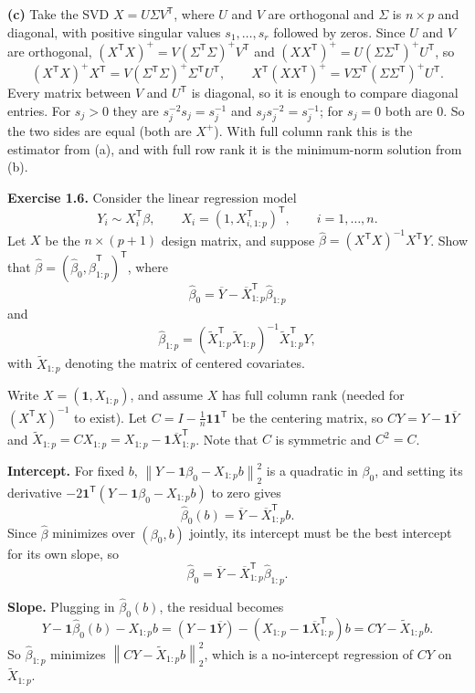 \documentclass[answers,12pt,addpoints]{exam}
\newcommand{\trans}{^{\mathsf T}}
\newcommand{\normtwo}[1]{\left\lVert #1\right\rVert_2}
\newcommand{\ones}{\mathbf{1}}  %
\begin{document}
\begin{questions}
\begin{solution}
\textbf{(c)} Take the SVD $X=U\Sigma V\trans$, where $U$ and $V$ are
orthogonal and $\Sigma$ is $n\times p$ and diagonal, with positive singular
values $s_1,\ldots,s_r$ followed by zeros. Since $U$ and $V$ are orthogonal,
$(X\trans X)^+=V(\Sigma\trans\Sigma)^+V\trans$ and
$(XX\trans)^+=U(\Sigma\Sigma\trans)^+U\trans$, so
\[
(X\trans X)^+X\trans=V(\Sigma\trans\Sigma)^+\Sigma\trans U\trans,
\qquad
X\trans(XX\trans)^+=V\Sigma\trans(\Sigma\Sigma\trans)^+U\trans.
\]
Every matrix between $V$ and $U\trans$ is diagonal, so it is enough to compare
diagonal entries. For $s_j>0$ they are $s_j^{-2}s_j=s_j^{-1}$ and
$s_js_j^{-2}=s_j^{-1}$; for $s_j=0$ both are $0$. So the two sides are equal
(both are $X^+$). With full column rank this is the estimator from (a), and
with full row rank it is the minimum-norm solution from (b).
\end{solution}
 
\question \textbf{Exercise 1.6.}
Consider the linear regression model
\[
Y_i\sim X_i\trans\beta,
\qquad
X_i=(1,X_{i,1:p}\trans)\trans,
\qquad i=1,\ldots,n.
\]
Let $X$ be the $n\times(p+1)$ design matrix, and suppose
$\widehat\beta=(X\trans X)^{-1}X\trans Y$.  Show that
$\widehat\beta=(\widehat\beta_0,\widehat\beta_{1:p}\trans)\trans$, where
\[
\widehat\beta_0
=\overline Y-\overline X_{1:p}\trans\widehat\beta_{1:p}
\]
and
\[
\widehat\beta_{1:p}
=(\widetilde X_{1:p}\trans\widetilde X_{1:p})^{-1}
 \widetilde X_{1:p}\trans Y,
\]
with $\widetilde X_{1:p}$ denoting the matrix of centered covariates.
 
\begin{solution}
Write $X=(\ones,X_{1:p})$, and assume $X$ has full column rank
(needed for $(X\trans X)^{-1}$ to exist). Let $C=I-\frac1n\ones\ones\trans$ be
the centering matrix, so $CY=Y-\ones\overline Y$ and
$\widetilde X_{1:p}=CX_{1:p}=X_{1:p}-\ones\overline X_{1:p}\trans$. Note that $C$ is symmetric
and $C^2=C$.
 
\textbf{Intercept.} For fixed $b$, $\normtwo{Y-\ones\beta_0-X_{1:p}b}^2$ is a
quadratic in $\beta_0$, and setting its derivative
$-2\ones\trans(Y-\ones\beta_0-X_{1:p}b)$ to zero gives
\[
\widehat\beta_0(b)=\overline Y-\overline X_{1:p}\trans b .
\]
Since $\widehat\beta$ minimizes over $(\beta_0,b)$ jointly, its intercept must
be the best intercept for its own slope, so
\[
\widehat\beta_0=\overline Y-\overline X_{1:p}\trans\widehat\beta_{1:p}.
\]
 
\textbf{Slope.} Plugging in $\widehat\beta_0(b)$, the residual becomes
\[
Y-\ones\widehat\beta_0(b)-X_{1:p}b
=(Y-\ones\overline Y)-(X_{1:p}-\ones\overline X_{1:p}\trans)b
=CY-\widetilde X_{1:p}b .
\]
So $\widehat\beta_{1:p}$ minimizes $\normtwo{CY-\widetilde X_{1:p}b}^2$, which is a
no-intercept regression of $CY$ on $\widetilde X_{1:p}$.
 

\end{solution}
\end{questions}
\end{document}
